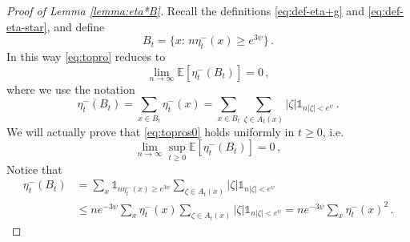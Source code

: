 \documentclass[10pt,a4paper]{amsart}
\newcommand{\E}{\mathds{E}}
\newcommand{\car}{\mathds{1}}
\begin{document}
\begin{proof}[Proof of Lemma \ref{lemma:eta*B}]	Recall the definitions \eqref{eq:def-eta+g} and \eqref{eq:def-eta-star}, and define
	\begin{equation}
		B_t=\{x:\, n\eta_{t}^-(x)\ge e^{3\psi} \}\,.
	\end{equation}
	In this way \eqref{eq:topro} reduces to 
		\begin{equation}\label{eq:topros0}
			\lim_{n\to\infty}\E\left[\eta_{t}^-(B_t)\right]=0\,,
		\end{equation}
		where we use the notation 
		\begin{equation}\label{eq:zeta-B}
				\eta_t^-(B_t)=\sum_{x\in B_t}\eta^-_t(x) = \sum_{x\in B_t}\sum_{\zeta\in A_t(x)}|\zeta|\car_{n|\zeta|<e^\psi}
				\,.
				\end{equation}
We will actually prove that \eqref{eq:topros0} holds uniformly in $t\ge 0$, i.e.\
\begin{equation}\label{eq:topros}
			\lim_{n\to\infty}\sup_{t\ge 0}\E\left[\eta_{t}^-(B_t)\right]=0\,,
		\end{equation}
Notice that
		\begin{align}
				\eta_t^-(B_t)&=\sum_{x}\car_{n\eta_t^-(x)\ge e^{3\psi}}\sum_{\zeta\in A_t(x)}|\zeta|\car_{n|\zeta|< e^{\psi}}\\
				&\le ne^{-3\psi}\sum_{x}\eta_t^-(x)\sum_{\zeta\in A_t(x)}|\zeta|\car_{n|\zeta|< e^{\psi}}
				= ne^{-3\psi}\sum_{x}\eta_t^-(x)^2\,.
		\label{eq:zeta-B2}\end{align}


\end{proof}
\end{document}
